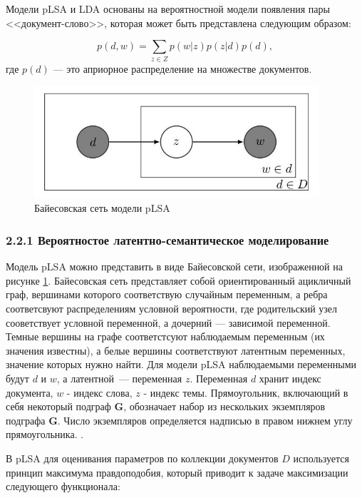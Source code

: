 \documentclass[a4paper]{report}
\begin{document}
	Модели pLSA и LDA основаны на вероятностной модели появления пары <<документ-слово>>,  которая может быть представлена следующим образом:
	
	\begin{equation}
	p(d,w) = \sum_{z \in Z}p(w|z) p(z|d) p(d),
	\label{eq:pmodel}
	\end{equation}
	где $p(d)$ --- это априорное распределение на множестве документов.
	
	
	\begin{figure}
		\centering
		\includegraphics[width=400px]
		{imgs/PLSA.jpg}
		\caption{Байесовская сеть модели pLSA}
		\label{fig:plsa}
	\end{figure} 
	
	
	\subsubsection{2.2.1 Вероятностое латентно-семантическое моделирование}
	Модель pLSA можно представить в виде Байесовской сети, изображенной на рисунке \ref{fig:plsa}. Байесовская сеть представляет собой ориентированный ацикличный граф, вершинами которого соответствую случайным переменным, а ребра соответсвуют распределениям условной вероятности, где родительский узел сооветствует условной переменной, а дочерний --- зависимой переменной. Темные вершины на графе соответстсуют наблюдаемым переменным (их значения известны), а белые вершины соответствуют латентным переменных, значение которых нужно найти. Для модели pLSA наблюдаемыми переменными будут $d$  и $w$, а латентной~--- переменная $z$. Переменная $d$ хранит индекс документа, $w$ - индекс слова, $z$ - индекс темы. Прямоугольник, включающий в себя некоторый подграф $\mathbf{G}$, обозначает набор из нескольких экземпляров подграфа $\mathbf{G}$. Число экземпляров определяется надписью в правом нижнем углу прямоугольника.
	\cite{bib:Heinrich}. 
	
	В pLSA для оценивания параметров по коллекции документов $D$ используется принцип максимума правдоподобия, который приводит к задаче максимизации следующего функционала:
	
\end{document}
